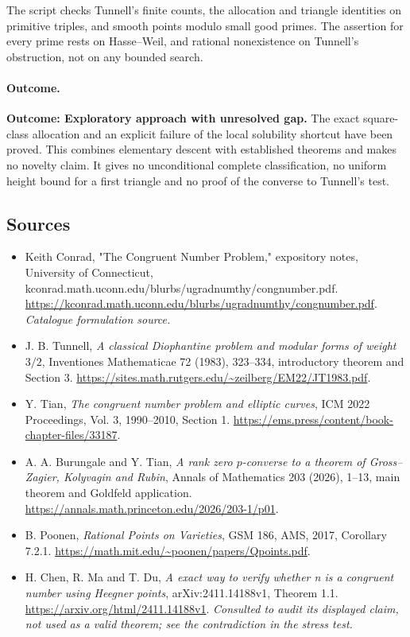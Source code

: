 \documentclass[11pt,a4paper]{article}
\numberwithin{equation}{section}
\begin{document}
The script checks Tunnell's finite counts, the allocation and triangle
identities on primitive triples, and smooth points modulo small good primes.
The assertion for every prime rests on Hasse--Weil, and rational nonexistence
on Tunnell's obstruction, not on any bounded search.

\paragraph{Outcome.}
\textbf{Outcome: Exploratory approach with unresolved gap.}
The exact square-class allocation and an explicit failure of the local
solubility shortcut have been proved. This combines elementary descent with
established theorems and makes no novelty claim. It gives no unconditional
complete classification, no uniform height bound for a first triangle and
no proof of the converse to Tunnell's test.

\subsection{Sources}
\begin{itemize}\raggedright
\item[\textnormal{[S1]}]\hypertarget{source:8900008:1}{} Keith Conrad, "The Congruent Number Problem," expository notes, University of Connecticut, kconrad.math.uconn.edu/blurbs/ugradnumthy/congnumber.pdf.
\url{https://kconrad.math.uconn.edu/blurbs/ugradnumthy/congnumber.pdf}.
{\small\textit{Catalogue formulation source.}}
\item[\textnormal{[E1]}]\hypertarget{extra:8900008:1}{} J. B. Tunnell,
\emph{A classical Diophantine problem and modular forms of weight $3/2$},
Inventiones Mathematicae 72 (1983), 323--334, introductory theorem and Section 3.
\url{https://sites.math.rutgers.edu/~zeilberg/EM22/JT1983.pdf}.
\item[\textnormal{[E2]}]\hypertarget{extra:8900008:2}{} Y. Tian,
\emph{The congruent number problem and elliptic curves}, ICM 2022 Proceedings,
Vol. 3, 1990--2010, Section 1.
\url{https://ems.press/content/book-chapter-files/33187}.
\item[\textnormal{[E3]}]\hypertarget{extra:8900008:3}{} A. A. Burungale and Y. Tian,
\emph{A rank zero $p$-converse to a theorem of Gross--Zagier, Kolyvagin and
Rubin}, Annals of Mathematics 203 (2026), 1--13, main theorem and Goldfeld
application. \url{https://annals.math.princeton.edu/2026/203-1/p01}.
\item[\textnormal{[E4]}]\hypertarget{extra:8900008:4}{} B. Poonen,
\emph{Rational Points on Varieties}, GSM 186, AMS, 2017, Corollary 7.2.1.
\url{https://math.mit.edu/~poonen/papers/Qpoints.pdf}.
\item[\textnormal{[E5]}]\hypertarget{extra:8900008:5}{} H. Chen, R. Ma and T. Du,
\emph{A exact way to verify whether n is a congruent number using Heegner
points}, arXiv:2411.14188v1, Theorem 1.1.
\url{https://arxiv.org/html/2411.14188v1}.
{\small\textit{Consulted to audit its displayed claim, not used as a valid
theorem; see the contradiction in the stress test.}}

\end{itemize}
\end{document}

